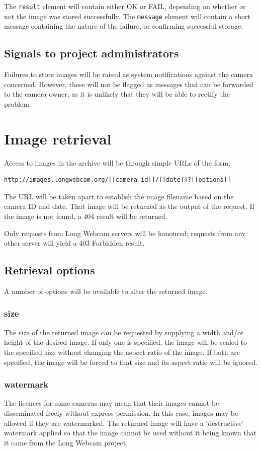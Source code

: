 \documentclass[11pt]{article}
\begin{document}
The \verb+result+ element will contain either OK or FAIL, depending on whether or not the image was stored successfully. The \verb+message+ element will contain a short message containing the nature of the failure, or confirming successful storage.

\subsection{Signals to project administrators}
Failures to store images will be raised as system notifications against the camera concerned. However, these will not be flagged as messages that can be forwarded to the camera owner, as it is unlikely that they will be able to rectify the problem.

\section{Image retrieval}
Access to images in the archive will be through simple URLs of the form:

\begin{verbatim}
http://images.longwebcam.org/[[camera_id]]/[[date]]?[[options]]
\end{verbatim}

The URL will be taken apart to establish the image filename based on the camera ID and date. That image will be returned as the output of the request. If the image is not found, a 404 result will be returned.

Only requests from Long Webcam servers will be honoured; requests from any other server will yield a 403 Forbidden result.

\subsection{Retrieval options}
A number of options will be available to alter the returned image.

\subsubsection{size}
The size of the returned image can be requested by supplying a width and/or height of the desired image. If only one is specified, the image will be scaled to the specified size without changing the aspect ratio of the image. If both are specified, the image will be forced to that size and its aspect ratio will be ignored.

\subsubsection{watermark}
The licences for some cameras may mean that their images cannot be disseminated freely without express permission. In this case, images may be allowed if they are watermarked. The returned image will have a `destructive' watermark applied so that the image cannot be used without it being known that it came from the Long Webcam project.
\end{document}
